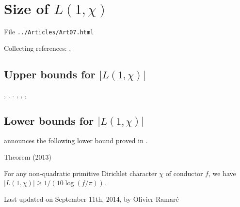 \chapter{   Size of $L(1,\chi)$}

File \texttt{../Articles/Art07.html}









Collecting references:
\cite{Louboutin*93},


\section{Upper bounds for $|L(1,\chi)|$
}


\cite{Louboutin*96},
\cite{Granville-Soundararajan*02},
\cite{Granville-Soundararajan*04}.
\cite{Ramare*01},
\cite{Ramare*02-??},
\cite{Louboutin*98},

\section{Lower bounds for $|L(1,\chi)|$
}

\cite{Louboutin*13}
announces the following lower bound proved in
\cite{Louboutin*15}
.

\begin{thm}{Theorem (2013)}

For any non-quadratic primitive Dirichlet character $\chi$ of conductor $f$,
we have $|L(1,\chi)|\ge 1/ ( 10\log(f/\pi))$.
\end{thm}





 
 








  
  Last updated on September 11th, 2014, by Olivier Ramar\'e
















